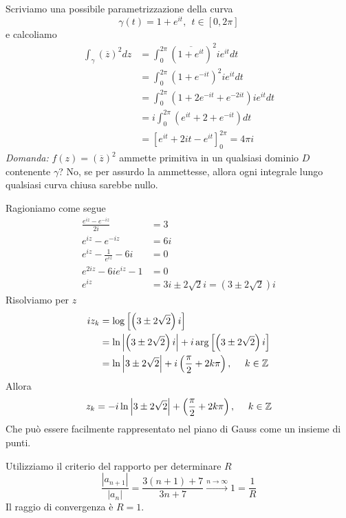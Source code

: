 Scriviamo una possibile parametrizzazione della curva
\begin{equation*}
\gamma \left(t\right) = 1 + e^{it} ,\ \ t\in \left[ 0,2\pi \right]
\end{equation*}
e calcoliamo
\begin{align*}
\int\nolimits _{\gamma }\left(\overline{z}\right)^{2} dz & = \int\nolimits ^{2\pi }_{0}\left(\overline{1 + e^{it}}\right)^{2} ie^{it} dt\\
 & = \int\nolimits ^{2\pi }_{0}\left(1 + e^{ - it}\right)^{2} ie^{it} dt\\
 & = \int\nolimits ^{2\pi }_{0}\left(1 + 2e^{ - it} + e^{ - 2it}\right) ie^{it} dt\\
 & = i\int\nolimits ^{2\pi }_{0}\left(e^{it} + 2 + e^{ - it}\right) dt\\
 & = \left[ e^{it} + 2it - e^{it}\right]^{2\pi }_{0} = 4\pi i
\end{align*}
\textit{Domanda:} $f\left(z\right) = \left(\overline{z}\right)^{2}$ ammette primitiva in un qualsiasi dominio $D$ contenente $\gamma $? No, se per assurdo la ammettesse, allora ogni integrale lungo qualsiasi curva chiusa sarebbe nullo.
\Soluzione

Ragioniamo come segue
\begin{align*}
\frac{e^{iz} - e^{ - iz}}{2i} & = 3\\
e^{iz} - e^{ - iz} & = 6i\\
e^{iz} - \frac{1}{e^{iz}} - 6i & = 0\\
e^{2iz} - 6ie^{iz} - 1 & = 0\\
e^{iz} & = 3i\pm 2\sqrt{2} i = \left(3\pm 2\sqrt{2}\right) i
\end{align*}
Risolviamo per $z$
\begin{align*}
iz_{k} & = \log\left[\left(3\pm 2\sqrt{2}\right) i\right]\\
 & = \ln\left| \left(3\pm 2\sqrt{2}\right) i\right| + i\arg\left[\left(3\pm 2\sqrt{2}\right) i\right]\\
 & = \ln\left| 3\pm 2\sqrt{2}\right| + i\left(\frac{\pi }{2} + 2k\pi \right) ,\ \ \ \ k\in \mathbb{Z} 
\end{align*}
Allora
\begin{equation*}
z_{k} = - i\ln\left| 3\pm 2\sqrt{2}\right| + \left(\frac{\pi }{2} + 2k\pi \right) ,\ \ \ \ k\in \mathbb{Z} 
\end{equation*}
Che può essere facilmente rappresentato nel piano di Gauss come un insieme di punti.
\Soluzione

Utilizziamo il criterio del rapporto per determinare $R$
\begin{equation*}
\frac{\left| a_{n + 1}\right| }{\left| a_{n}\right| } = \frac{3\left(n + 1\right) + 7}{3n + 7}\xrightarrow{n\rightarrow \infty } 1 = \frac{1}{R}
\end{equation*}
Il raggio di convergenza è $R = 1$.

